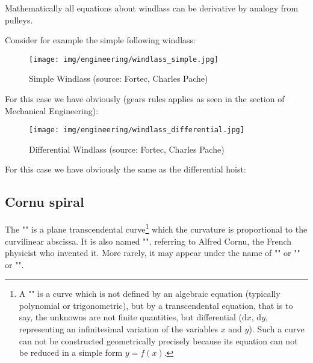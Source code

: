 	Mathematically all equations about windlass can be derivative by analogy from pulleys.
	
	Consider for example the simple following windlass:
	\begin{figure}[H]
		\centering
		\texttt{[image: img/engineering/windlass\_simple.jpg]}
		\caption[Simple Windlass]{Simple Windlass (source: Fortec, Charles Pache)}
	\end{figure}
	For this case we have obviously (gears rules applies as seen in the section of Mechanical Engineering):
	
	\begin{figure}[H]
		\centering
		\texttt{[image: img/engineering/windlass\_differential.jpg]}
		\caption[Differential Windlass]{Differential Windlass (source: Fortec, Charles Pache)}
	\end{figure}
	For this case we have obviously the same as the differential hoist:
	
		
	\pagebreak
	\subsection{Cornu spiral}
	The "" is a plane transcendental curve\footnote{A "" is a curve which is not defined by an algebraic equation (typically polynomial or trigonometric), but by a transcendental equation, that is to say, the unknowns are not finite quantities, but differential ($\mathrm{d}x$, $\mathrm{d}y$, representing an infinitesimal variation of the variables $x$ and $y$). Such a curve can not be constructed geometrically precisely because its equation can not be reduced in a simple form $y = f (x)$.}  which the curvature is proportional to the curvilinear abscissa. It is also named "", referring to Alfred Cornu, the French physicist who invented it. More rarely, it may appear under the name of "" or "" or "".
	
